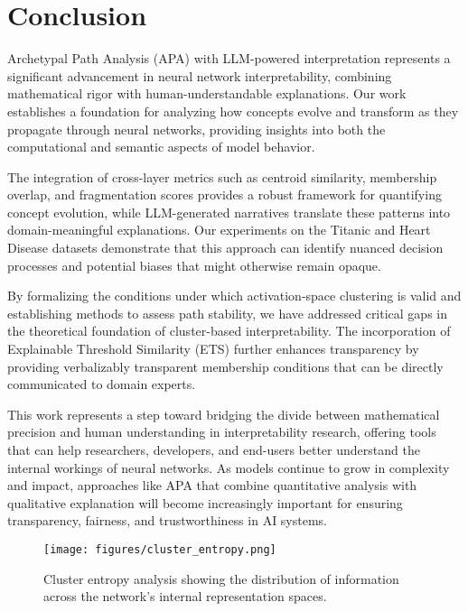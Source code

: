 \section{Conclusion}

Archetypal Path Analysis (APA) with LLM-powered interpretation represents a significant advancement in neural network interpretability, combining mathematical rigor with human-understandable explanations. Our work establishes a foundation for analyzing how concepts evolve and transform as they propagate through neural networks, providing insights into both the computational and semantic aspects of model behavior.

The integration of cross-layer metrics such as centroid similarity, membership overlap, and fragmentation scores provides a robust framework for quantifying concept evolution, while LLM-generated narratives translate these patterns into domain-meaningful explanations. Our experiments on the Titanic and Heart Disease datasets demonstrate that this approach can identify nuanced decision processes and potential biases that might otherwise remain opaque.

By formalizing the conditions under which activation-space clustering is valid and establishing methods to assess path stability, we have addressed critical gaps in the theoretical foundation of cluster-based interpretability. The incorporation of Explainable Threshold Similarity (ETS) further enhances transparency by providing verbalizably transparent membership conditions that can be directly communicated to domain experts.

This work represents a step toward bridging the divide between mathematical precision and human understanding in interpretability research, offering tools that can help researchers, developers, and end-users better understand the internal workings of neural networks. As models continue to grow in complexity and impact, approaches like APA that combine quantitative analysis with qualitative explanation will become increasingly important for ensuring transparency, fairness, and trustworthiness in AI systems.

\begin{figure}[ht]
    \centering
    \texttt{[image: figures/cluster\_entropy.png]}
    \caption{Cluster entropy analysis showing the distribution of information across the network's internal representation spaces.}
    \label{fig:cluster_entropy}
\end{figure}